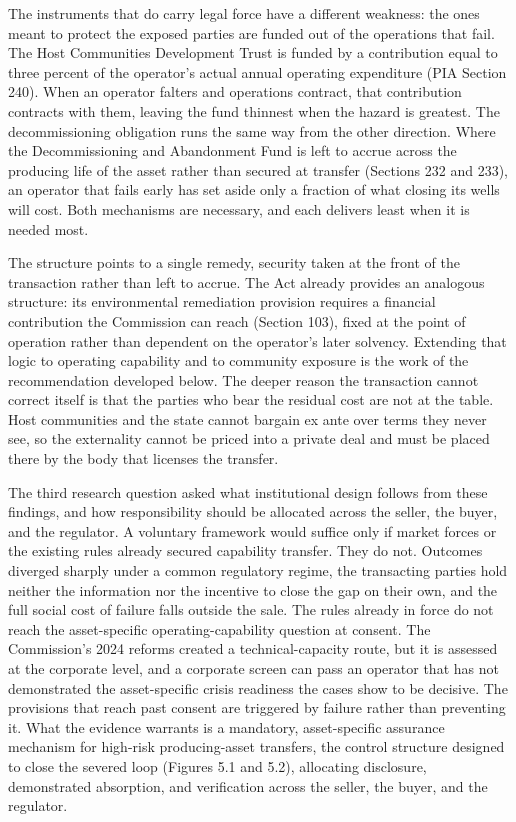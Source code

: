 \documentclass[twoside,fontset=lmodern]{mitthesis}
\begin{document}
The instruments that do carry legal force have a different weakness: the
ones meant to protect the exposed parties are funded out of the
operations that fail. The Host Communities Development Trust is funded
by a contribution equal to three percent of the operator's actual annual
operating expenditure (PIA Section 240). When an operator falters and
operations contract, that contribution contracts with them, leaving the
fund thinnest when the hazard is greatest. The decommissioning
obligation runs the same way from the other direction. Where the
Decommissioning and Abandonment Fund is left to accrue across the
producing life of the asset rather than secured at transfer (Sections
232 and 233), an operator that fails early has set aside only a fraction
of what closing its wells will cost. Both mechanisms are necessary, and
each delivers least when it is needed most.

The structure points to a single remedy, security taken at the front of
the transaction rather than left to accrue. The Act already provides an
analogous structure: its environmental remediation provision requires a
financial contribution the Commission can reach (Section 103), fixed at
the point of operation rather than dependent on the operator's later
solvency. Extending that logic to operating capability and to community
exposure is the work of the recommendation developed below. The deeper
reason the transaction cannot correct itself is that the parties who
bear the residual cost are not at the table. Host communities and the
state cannot bargain ex ante over terms they never see, so the
externality cannot be priced into a private deal and must be placed
there by the body that licenses the transfer.

The third research question asked what institutional design follows from
these findings, and how responsibility should be allocated across the
seller, the buyer, and the regulator. A voluntary framework would
suffice only if market forces or the existing rules already secured
capability transfer. They do not. Outcomes diverged sharply under a
common regulatory regime, the transacting parties hold neither the
information nor the incentive to close the gap on their own, and the
full social cost of failure falls outside the sale. The rules already in
force do not reach the asset-specific operating-capability question at
consent. The Commission's 2024 reforms created a technical-capacity
route, but it is assessed at the corporate level, and a corporate screen
can pass an operator that has not demonstrated the asset-specific crisis
readiness the cases show to be decisive. The provisions that reach past
consent are triggered by failure rather than preventing it. What the
evidence warrants is a mandatory, asset-specific assurance mechanism for
high-risk producing-asset transfers, the control structure designed to
close the severed loop (Figures 5.1 and 5.2), allocating disclosure,
demonstrated absorption, and verification across the seller, the buyer,
and the regulator.
\end{document}
